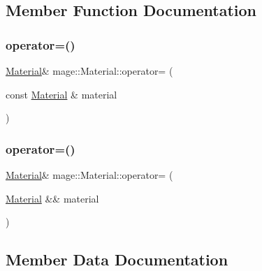 \subsection{Member Function Documentation}
\hypertarget{structmage_1_1_material_a7ebc9986924ca13ae8468005518dcfc7}{}\label{structmage_1_1_material_a7ebc9986924ca13ae8468005518dcfc7} 
\subsubsection{\texorpdfstring{operator=()}{operator=()}\hspace{0.1cm}{\footnotesize\ttfamily [1/2]}}
{\footnotesize\ttfamily \hyperlink{structmage_1_1_material}{Material}\& mage\+::\+Material\+::operator= (\begin{DoxyParamCaption}\item[{const \hyperlink{structmage_1_1_material}{Material} \&}]{material }\end{DoxyParamCaption})\hspace{0.3cm}{\ttfamily [default]}}

\hypertarget{structmage_1_1_material_a500a2ebe99d4d7b3be5bf57b6bff62a1}{}\label{structmage_1_1_material_a500a2ebe99d4d7b3be5bf57b6bff62a1} 
\subsubsection{\texorpdfstring{operator=()}{operator=()}\hspace{0.1cm}{\footnotesize\ttfamily [2/2]}}
{\footnotesize\ttfamily \hyperlink{structmage_1_1_material}{Material}\& mage\+::\+Material\+::operator= (\begin{DoxyParamCaption}\item[{\hyperlink{structmage_1_1_material}{Material} \&\&}]{material }\end{DoxyParamCaption})\hspace{0.3cm}{\ttfamily [default]}}



\subsection{Member Data Documentation}
\hypertarget{structmage_1_1_material_ad8fb842410fe751ad220185271a00448}{}\label{structmage_1_1_material_ad8fb842410fe751ad220185271a00448} 
